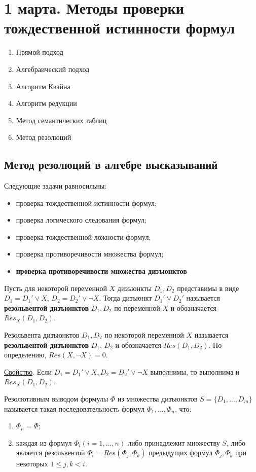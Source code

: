 \chapter{1 марта. Методы проверки тождественной истинности формул}
\begin{enumerate}
    \item Прямой подход
    \item Алгебраический подход
    \item Алгоритм Квайна
    \item Алгоритм редукции
    \item Метод семантических таблиц
    \item Метод резолюций
\end{enumerate}
\section{Метод резолюций в алгебре высказываний}
Следующие задачи равносильны:
\begin{itemize}
    \item проверка тождественной истинности формул;
    \item проверка логического следования формул;
    \item проверка тождественной ложности формул;
    \item проверка противоречивости множества формул;
    \item \textbf{проверка противоречивости множества дизъюнктов}
\end{itemize}

\dftion Пусть для некоторой переменной $X$ дизъюнкты $D_1, D_2$ представимы в виде $D_1 = D_1' \lor X$, $D_2 = D_2' \lor \lnot X$. Тогда дизъюнкт $D_1' \lor D_2'$ называется \textbf{резольвентой дизъюнктов} $D_1, D_2$ по переменной $X$ и обозначается $Res_X(D_1, D_2)$.

Резольвента дизъюнктов $D_1, D_2$ по некоторой переменной $X$ называется \textbf{резольвентой дизъюнктов} $D_1$, $D_2$ и обозначается $Res(D_1, D_2)$. По определению, $Res(X, \lnot X) = 0$.

\underline{Свойство}. Если $D_1 = D_1' \lor X, D_2 = D_2' \lor \lnot X$ выполнимы, то выполнима и $Res_X(D_1, D_2)$.

\dftion Резолютивным выводом формулы $\Phi$ из множества дизъюнктов $S = \{D_1, \dots, D_m\}$ называется такая последовательность формул $\Phi_1, \dots, \Phi_n$, что:
\begin{enumerate}
    \item $\Phi_n = \Phi$;
    \item каждая из формул $\Phi_i (i = 1,\dots,n)$ либо принадлежит множеству $S$, либо является резольвентой $\Phi_i = Res(\Phi_j, \Phi_k)$ предыдущих формул $\Phi_j, \Phi_k$ при некоторых $1 \leq j, k < i$.
\end{enumerate}

